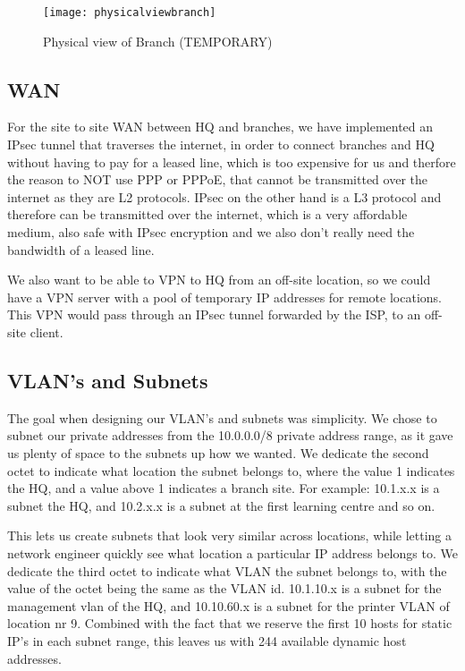 \begin{figure}[H]
\caption{Physical view of Branch (TEMPORARY)}
\centering
\texttt{[image: physicalviewbranch]}
\label{physicalviewbranch}
\end{figure}


\subsection{WAN}

For the site to site WAN between HQ and branches, we have implemented an IPsec tunnel that traverses the internet, in order to connect branches and HQ without having to pay for a leased line, which is too expensive for us and therfore the reason to NOT use PPP or PPPoE, that cannot be transmitted over the internet as they are L2 protocols. IPsec on the other hand is a L3 protocol and therefore can be transmitted over the internet, which is a very affordable medium, also safe with IPsec encryption and we also don't really need the bandwidth of a leased line.

We also want to be able to VPN to HQ from an off-site location, so we could have a VPN server with a pool of temporary IP addresses for remote locations. This VPN would pass through an IPsec tunnel forwarded by the ISP, to an off-site client.

\subsection{VLAN's and Subnets}

The goal when designing our VLAN's and subnets was simplicity. We chose to subnet our private addresses from the 10.0.0.0/8 private address range, as it gave us plenty of space to the subnets up how we wanted.
We dedicate the second octet to indicate what location the subnet belongs to, where the value 1 indicates the HQ, and a value above 1 indicates a branch site. For example: 10.1.x.x is a subnet the HQ, and 10.2.x.x is a subnet at the first learning centre and so on.

This lets us create subnets that look very similar across locations, while letting a network engineer quickly see what location a particular IP address belongs to. We dedicate the third octet to indicate what VLAN the subnet belongs to, with the value of the octet being the same as the VLAN id. 10.1.10.x is a subnet for the management vlan of the HQ, and 10.10.60.x is a subnet for the printer VLAN of location nr 9. Combined with the fact that we reserve the first 10 hosts for static IP's in each subnet range, this leaves us with 244 available dynamic host addresses.

